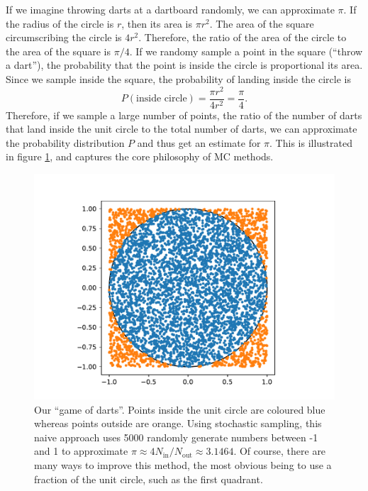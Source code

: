 If we imagine throwing darts at a dartboard randomly, we can approximate $\pi$. If the radius of the circle is $r$, then its area is $\pi r^2$. The area of the square circumscribing the circle is $4r^2$. Therefore, the ratio of the area of the circle to the area of the square is $\pi/4$. If we randomy sample a point in the square (``throw a dart''), the probability that the point is inside the circle is proportional its area. Since we sample inside the square, the probability of landing inside the circle is
\begin{equation}
    P(\text{inside circle}) =  \frac{\pi r^2}{4r^2} = \frac{\pi}{4}.
\end{equation}
Therefore, if we sample a large number of points, the ratio of the number of darts that land inside the unit circle to the total number of darts, we can approximate the probability distribution $P$ and thus get an estimate for $\pi$. This is illustrated in figure \ref{fig:darts}, and captures the core philosophy of \gls{MC} methods.

\begin{figure}[htbp]
    \centering
    \includegraphics[width=\textwidth]{figures/qmc/darts.pdf}
    \caption{Our ``game of darts''. Points inside the unit circle are coloured blue whereas points outside are orange. Using stochastic sampling, this naive approach uses 5000 randomly generate numbers between -1 and 1 to approximate $\pi\approx 4N_\mathrm{in}/N_\mathrm{out}\approx 3.1464$. Of course, there are many ways to improve this method, the most obvious being to use a fraction of the unit circle, such as the first quadrant.}
    \label{fig:darts}
\end{figure}

